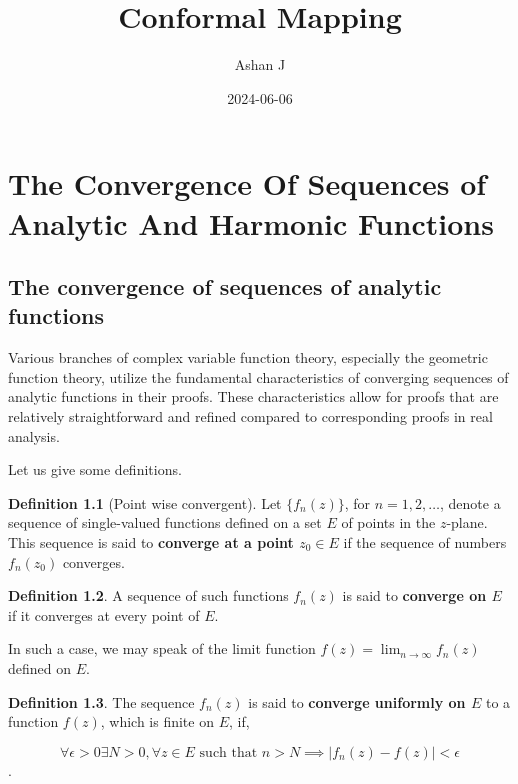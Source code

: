 \documentclass[
]{book}
\title{Conformal Mapping}
\author{Ashan J}
\date{2024-06-06}
\theoremstyle{definition}
\newtheorem{definition}{Definition}[chapter]
\theoremstyle{definition}
\theoremstyle{definition}
\theoremstyle{definition}
\theoremstyle{remark}
\begin{document}
\maketitle

{
\setcounter{tocdepth}{1}
\tableofcontents
}
\chapter{The Convergence Of Sequences of Analytic And Harmonic Functions}\label{the-convergence-of-sequences-of-analytic-and-harmonic-functions}

\section{The convergence of sequences of analytic functions}\label{the-convergence-of-sequences-of-analytic-functions}

Various branches of complex variable function theory, especially the geometric function theory, utilize the fundamental characteristics of converging sequences of analytic functions in their proofs. These characteristics allow for proofs that are relatively straightforward and refined compared to corresponding proofs in real analysis.

Let us give some definitions.

\begin{definition}[Point wise convergent]
\protect\hypertarget{def:unnamed-chunk-1}{}\label{def:unnamed-chunk-1}Let \(\{f_n (z)\}\), for \(n = 1, 2, \ldots\), denote a sequence of single-valued functions defined on a set \(E\) of points in the \(z\)-plane.
This sequence is said to \textbf{converge at a point \(z_0 \in E\)} if the sequence of numbers \(f_n (z_0)\) converges.
\end{definition}

\begin{definition}
\protect\hypertarget{def:unnamed-chunk-2}{}\label{def:unnamed-chunk-2}A sequence of such functions \(f_n (z)\) is said to \textbf{converge on \(E\)} if it converges at every point of \(E\).

In such a case, we may speak of the limit function \(f(z) = \lim_{n\to\infty} f_n (z)\) defined on \(E\).
\end{definition}

\begin{definition}
\protect\hypertarget{def:unnamed-chunk-3}{}\label{def:unnamed-chunk-3}The sequence \({f_n (z)}\) is said to \textbf{converge uniformly on \(E\)} to a function \(f(z)\), which is finite on \(E\), if,

\[\forall \epsilon > 0 \exists N > 0 , \forall z \in E \text{ such that } n > N \implies |f_n (z) - f(z)| < \epsilon \].
\end{definition}
\end{document}
